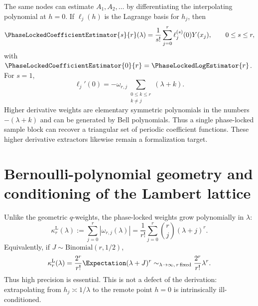 \documentclass[11pt]{article}
\numberwithin{equation}{section}
\theoremstyle{definition}
\theoremstyle{remark}
\begin{document}
The same nodes can estimate $A_1,A_2,\ldots$ by differentiating the interpolating polynomial at $h=0$. If $\ell_j(h)$ is the Lagrange basis for $h_j$, then
\begin{equation}
\PhaseLockedCoefficientEstimator{s}{r}(\lambda)
=\frac1{s!}\sum_{j=0}^{r}\ell_j^{(s)}(0)Y(x_j),
\qquad 0\le s\le r,
\label{p8:eq:As-extractor}
\end{equation}
with $\PhaseLockedCoefficientEstimator{0}{r}=\PhaseLockedLogEstimator{r}$. For $s=1$,
\begin{equation}
\ell_j'(0)
=-\omega_{r,j}\sum_{\substack{0\le k\le r\\k\ne j}}(\lambda+k).
\label{p8:eq:first-derivative-weight}
\end{equation}
Higher derivative weights are elementary symmetric polynomials in the numbers $-(\lambda+k)$ and can be generated by Bell polynomials. Thus a single phase-locked sample block can recover a triangular set of periodic coefficient functions.
These higher derivative extractors likewise remain a formalization target.

\section{Bernoulli-polynomial geometry and conditioning of the Lambert lattice}
\label{p8:sec:lambert-conditioning}

Unlike the geometric $q$-weights, the phase-locked weights grow polynomially in $\lambda$:
\begin{equation}
\kappa_r^{\mathrm L}(\lambda)
:=\sum_{j=0}^{r}|\omega_{r,j}(\lambda)|
=\frac1{r!}\sum_{j=0}^{r}\binom{r}{j}(\lambda+j)^r.
\label{p8:eq:lambert-condition}
\end{equation}
Equivalently, if $J\sim\mathrm{Binomial}(r,1/2)$,
\begin{equation}
\kappa_r^{\mathrm L}(\lambda)
=\frac{2^r}{r!}\Expectation(\lambda+J)^r
\sim_{\lambda\to\infty,\,r\,\mathrm{fixed}}\frac{2^r}{r!}\lambda^r.
\label{p8:eq:lambert-condition-asymp}
\end{equation}
Thus high precision is essential. This is not a defect of the derivation: extrapolating from $h_j\asymp1/\lambda$ to the remote point $h=0$ is intrinsically ill-conditioned.
\end{document}
